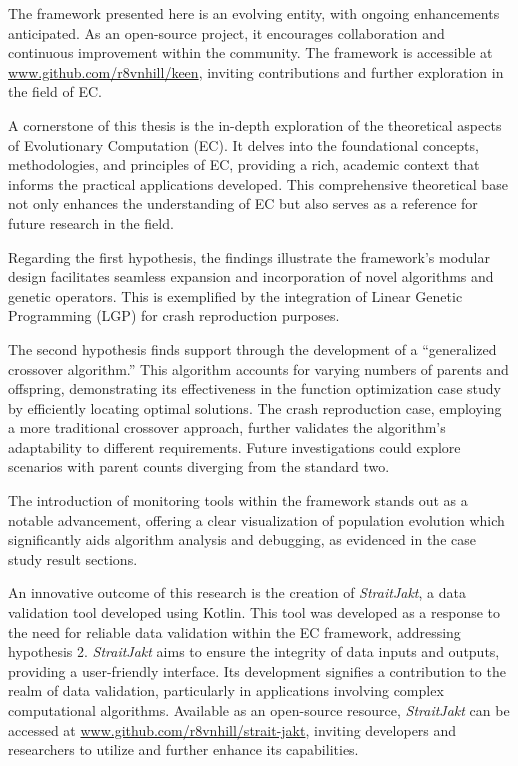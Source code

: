     The framework presented here is an evolving entity, with ongoing enhancements anticipated. As an open-source 
    project, it encourages collaboration and continuous improvement within the community. The framework is accessible at 
    \url{www.github.com/r8vnhill/keen}, inviting contributions and further exploration in the field of EC.

    A cornerstone of this thesis is the in-depth exploration of the theoretical aspects of Evolutionary Computation 
    (EC). It delves into the foundational concepts, methodologies, and principles of EC, providing a rich, academic 
    context that informs the practical applications developed. This comprehensive theoretical base not only enhances the 
    understanding of EC but also serves as a reference for future research in the field.
    
    Regarding the first hypothesis, the findings illustrate the framework's modular design facilitates seamless expansion and incorporation of novel algorithms and genetic operators. This is exemplified by the integration of Linear Genetic Programming (LGP) for crash reproduction purposes.

    The second hypothesis finds support through the development of a \enquote{generalized crossover algorithm.} This algorithm accounts for varying numbers of parents and offspring, demonstrating its effectiveness in the function optimization case study by efficiently locating optimal solutions. The crash reproduction case, employing a more traditional crossover approach, further validates the algorithm's adaptability to different requirements. Future investigations could explore scenarios with parent counts diverging from the standard two.

    The introduction of monitoring tools within the framework stands out as a notable advancement, offering a clear visualization of population evolution which significantly aids algorithm analysis and debugging, as evidenced in the case study result sections.

    An innovative outcome of this research is the creation of \textit{StraitJakt}, a data validation 
    tool developed using Kotlin. This tool was developed as a response to the need for reliable data 
    validation within the EC framework, addressing hypothesis 2. \textit{StraitJakt} aims to ensure 
    the integrity of data inputs and outputs, providing a user-friendly interface. Its development 
    signifies a contribution to the realm of data validation, 
    particularly in applications involving complex computational algorithms. Available as an 
    open-source resource, 
    \textit{StraitJakt} can be accessed at \url{www.github.com/r8vnhill/strait-jakt}, inviting 
    developers and researchers to utilize and further enhance its capabilities.
